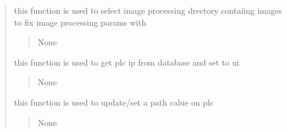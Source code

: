 \documentclass[letterpaper,10pt,english]{sphinxmanual}
\begin{document}
\begin{quote}
\begin{savenotes}
\begin{fulllineitems}
\begin{savenotes}\begin{fulllineitems}
\label{\detokenize{setting/setting_api:oxin.setting_api.API.select_image_procesing_directory}}
\pysigstartsignatures
{}
\pysigstopsignatures
\sphinxAtStartPar
this function is used to select image processing drectory contaiing images to fix image processing params with
\begin{quote}\begin{description}
\sphinxAtStartPar
None

\end{description}\end{quote}

\end{fulllineitems}\end{savenotes}


\begin{savenotes}\begin{fulllineitems}
\label{\detokenize{setting/setting_api:oxin.setting_api.API.set_plc_ip_to_ui}}
\pysigstartsignatures
{}
\pysigstopsignatures
\sphinxAtStartPar
this function is used to get plc ip from database and set to ui
\begin{quote}\begin{description}
\sphinxAtStartPar
None

\end{description}\end{quote}

\end{fulllineitems}\end{savenotes}


\begin{savenotes}\begin{fulllineitems}
\label{\detokenize{setting/setting_api:oxin.setting_api.API.set_plc_value}}
\pysigstartsignatures
{}
\pysigstopsignatures
\sphinxAtStartPar
this function is used to update/set a path calue on plc
\begin{quote}\begin{description}
\sphinxAtStartPar
None


\end{description}
\end{quote}
\end{fulllineitems}
\end{savenotes}
\end{fulllineitems}
\end{savenotes}
\end{quote}
\end{document}
